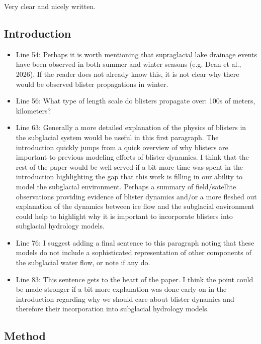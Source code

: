 \documentclass[11pt]{article}
\begin{document}
Very clear and nicely written.

\subsection*{Introduction}

\begin{itemize}[leftmargin=*]
\item Line 54: Perhaps it is worth mentioning that supraglacial lake drainage events have been
observed in both summer and winter seasons (e.g. Dean et al., 2026). If the reader does not
already know this, it is not clear why there would be observed blister propagations in winter.

\item Line 56: What type of length scale do blisters propagate over: 100s of meters, kilometers?

\item Line 63: Generally a more detailed explanation of the physics of blisters in the subglacial system
would be useful in this first paragraph. The introduction quickly jumps from a quick overview of
why blisters are important to previous modeling efforts of blister dynamics. I think that the rest
of the paper would be well served if a bit more time was spent in the introduction highlighting
the gap that this work is filling in our ability to model the subglacial environment. Perhaps a
summary of field/satellite observations providing evidence of blister dynamics and/or a more
fleshed out explanation of the dynamics between ice flow and the subglacial environment could
help to highlight why it is important to incorporate blisters into subglacial hydrology models.

\item Line 76: I suggest adding a final sentence to this paragraph noting that these models do not
include a sophisticated representation of other components of the subglacial water flow, or note
if any do.

\item Line 83: This sentence gets to the heart of the paper. I think the point could be made stronger if a
bit more explanation was done early on in the introduction regarding why we should care about
blister dynamics and therefore their incorporation into subglacial hydrology models.
\end{itemize}

\subsection*{Method}
\end{document}
